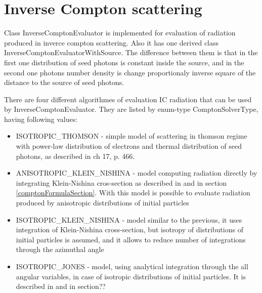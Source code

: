 \section{Inverse Compton scattering}
Class InverseComptonEvaluator is implemented for evaluation of radiation produced in inverce compton scattering. Also it has one derived class InverseComptonEvaluatorWithSource. The difference between them is that in the first one distribution of seed photons is constant inside the source, and in the second one photons number density is change proportionaly inverse square of the distance to the source of seed photons.

There are four different algorithmes of evaluation IC radiation that can be used by InverseComptonEvaluator. They are listed by enum-type ComptonSolverType, having following values:

\begin{itemize}
	\item ISOTROPIC\_THOMSON - simple model of scattering in thomson regime with power-law distribution of electrons and thermal distribution of seed photons, as described in \cite{Ginzburg1975} ch 17, p. 466.
	\item ANISOTROPIC\_KLEIN\_NISHINA - model computing radiation directly by integrating Klein-Nishina cros-section as described in \cite{KleinNishina, Dubus} and in section \ref{comptonFormulaSection}. With this model is possible to evaluate radiation produced by anisotropic distributions of initial particles
	\item ISOTROPIC\_KLEIN\_NISHINA - model similar to the previous, it uses integration of Klein-Nishina cross-section, but isotropy of distributions of initial particles is assumed, and it allows to reduce number of integrations through the azimuthal angle
	\item ISOTROPIC\_JONES - model, using analytical integration through the all angular variables, in case of isotropic distributions of initial particles. It is described in \cite{JonesCompton, BykovUvarov2000} and in section??
\end{itemize}

